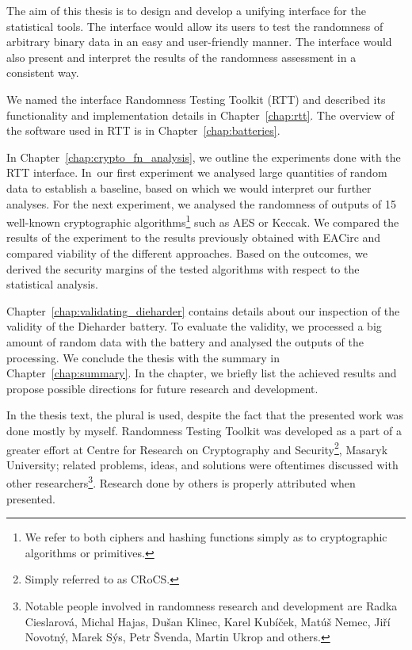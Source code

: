 \documentclass[
	digital,    %
	oneside,    %
	color,
	11pt,
	nocover,
	notable,
	nolof,
	nolot,
]{fithesis3}
\theoremstyle{definition}
\theoremstyle{remark}
\begin{document}
The aim of this thesis is to design and develop a unifying interface for the statistical tools. The interface would allow its users to test the randomness of arbitrary binary data in an easy and user-friendly manner. The interface would also present and interpret the results of the randomness assessment in a consistent way. 

We named the interface Randomness Testing Toolkit (RTT) \cite{rtt-github} and described its functionality and implementation details in Chapter~\ref{chap:rtt}. The overview of the software used in RTT is in Chapter~\ref{chap:batteries}. 

In Chapter~\ref{chap:crypto_fn_analysis}, we outline the experiments done with the RTT interface. In~our first experiment we analysed large quantities of random data to establish a baseline, based on which we would interpret our further analyses. For the next experiment, we analysed the randomness of outputs of 15 well-known cryptographic algorithms\footnote{We refer to both ciphers and hashing functions simply as to cryptographic algorithms or primitives.} such as AES or Keccak. We compared the results of the experiment to the results previously obtained with EACirc and compared viability of the different approaches. Based on the outcomes, we derived the security margins of the tested algorithms with respect to the statistical analysis.

Chapter~\ref{chap:validating_dieharder} contains details about our inspection of the validity of the Dieharder battery. To evaluate the validity, we processed a big amount of random data with the battery and analysed the outputs of the processing. We conclude the thesis with the summary in Chapter~\ref{chap:summary}. In the chapter, we briefly list the achieved results and propose possible directions for future research and development.

In the thesis text, the plural is used, despite the fact that the presented work was done mostly by myself. Randomness Testing Toolkit was developed as a part of a greater effort at Centre for Research on Cryptography and Security\footnote{Simply referred to as CRoCS.}, Masaryk University; related problems, ideas, and solutions were oftentimes discussed with other researchers\footnote{Notable people involved in randomness research and development are Radka Cieslarová, Michal Hajas, Dušan Klinec, Karel Kubíček, Matúš Nemec, Jiří Novotný, Marek Sýs, Petr Švenda, Martin Ukrop and others.}. Research done by others is properly attributed when presented.
\end{document}
